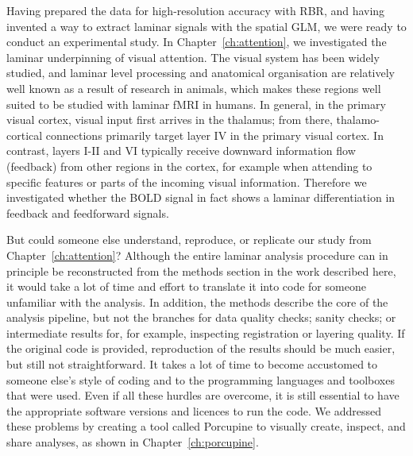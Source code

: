 Having prepared the data for high-resolution accuracy with RBR, and having invented a way to extract laminar signals with the spatial GLM, we were ready to conduct an experimental study. In Chapter~\ref{ch:attention}, we investigated the laminar underpinning of visual attention. The visual system has been widely studied, and laminar level processing and anatomical organisation are relatively well known as a result of research in animals, which makes these regions well suited to be studied with laminar fMRI in humans. In general, in the primary visual cortex, visual input first arrives in the thalamus; from there, thalamo-cortical connections primarily target layer IV in the primary visual cortex. In contrast, layers I-II and VI typically receive downward information flow (feedback) from other regions in the cortex, for example when attending to specific features or parts of the incoming visual information. Therefore we investigated whether the BOLD signal in fact shows a laminar differentiation in feedback and feedforward signals.

But could someone else understand, reproduce, or replicate our study from Chapter~\ref{ch:attention}? Although the entire laminar analysis procedure can in principle be reconstructed from the methods section in the work described here, it would take a lot of time and effort to translate it into code for someone unfamiliar with the analysis. In addition, the methods describe the core of the analysis pipeline, but not the branches for data quality checks; sanity checks; or intermediate results for, for example, inspecting registration or layering quality. If the original code is provided, reproduction of the results should be much easier, but still not straightforward. It takes a lot of time to become accustomed to someone else's style of coding and to the programming languages and toolboxes that were used. Even if all these hurdles are overcome, it is still essential to have the appropriate software versions and licences to run the code. We addressed these problems by creating a tool called Porcupine to visually create, inspect, and share analyses, as shown in Chapter~\ref{ch:porcupine}.

